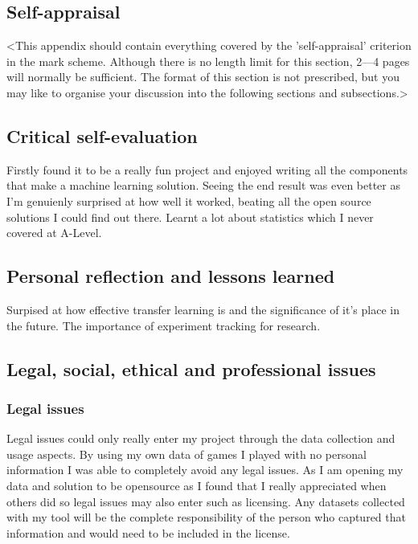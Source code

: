 \begin{appendices}

%
%
\chapter{Self-appraisal}

<This appendix should contain everything covered by the 'self-appraisal' criterion in the mark scheme. Although there is no length limit for this section, 2---4 pages will normally be sufficient. The format of this section is not prescribed, but you may like to organise your discussion into the following sections and subsections.>

\section{Critical self-evaluation}
Firstly found it to be a really fun project and enjoyed writing all the components that make a machine learning solution.  Seeing the end result was even better as 
I'm genuienly surprised at how well it worked, beating all the open source solutions I could find out there.  Learnt a lot about statistics which I never covered at A-Level.

\section{Personal reflection and lessons learned}
Surpised at how effective transfer learning is and the significance of it's place in the future.
The importance of experiment tracking for research.

\section{Legal, social, ethical and professional issues}

\subsection{Legal issues}
Legal issues could only really enter my project through the data collection and usage aspects.  By using my own data of games I played with no personal information 
I was able to completely avoid any legal issues.  As I am opening my data and solution to be opensource as I found that I really appreciated when others did so legal 
issues may also enter such as licensing.  Any datasets collected with my tool will be the complete responsibility of the person who captured that information and would 
need to be included in the license.


\end{appendices}
